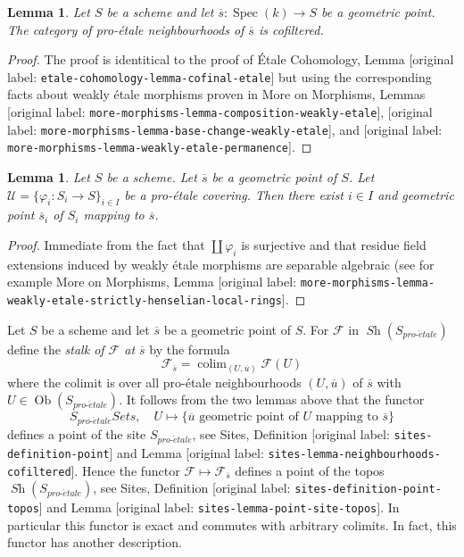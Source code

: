 \documentclass[10pt,a4paper]{article}
\theoremstyle{plain}
\newtheorem{lemma}[subsection]{Lemma}
\theoremstyle{definition}
\theoremstyle{remark}
\numberwithin{equation}{subsection}
\def\colim{\mathop{\mathrm{colim}}\nolimits}
\def\Spec{\mathop{\mathrm{Spec}}}
\def\Ob{\mathop{\mathrm{Ob}}\nolimits}
\def\Sh{\mathop{\mathit{Sh}}\nolimits}
\def\proetale{{pro\text{-}\acute{e}tale}}
\begin{document}
\begin{lemma}
\label{lemma-cofinal-etale}
Let $S$ be a scheme and let $\overline{s} : \Spec(k) \to S$ be a
geometric point. The category of pro-\'etale neighbourhoods of
$\overline{s}$ is cofiltered.
\end{lemma}

\begin{proof}
The proof is identitical to the proof of
\'Etale Cohomology, Lemma \textnormal{[original label: \nolinkurl{etale-cohomology-lemma-cofinal-etale}]}
but using the corresponding facts about weakly \'etale morphisms
proven in
More on Morphisms, Lemmas
\textnormal{[original label: \nolinkurl{more-morphisms-lemma-composition-weakly-etale}]},
\textnormal{[original label: \nolinkurl{more-morphisms-lemma-base-change-weakly-etale}]}, and
\textnormal{[original label: \nolinkurl{more-morphisms-lemma-weakly-etale-permanence}]}.
\end{proof}

\begin{lemma}
\label{lemma-geometric-lift-to-cover}
Let $S$ be a scheme. Let $\overline{s}$ be a geometric point of $S$.
Let $\mathcal{U} = \{\varphi_i : S_i \to S\}_{i\in I}$ be a
pro-\'etale covering. Then there exist $i \in I$ and geometric
point $\overline{s}_i$ of $S_i$ mapping to $\overline{s}$.
\end{lemma}

\begin{proof}
Immediate from the fact that $\coprod \varphi_i$ is surjective
and that residue field extensions induced by weakly \'etale
morphisms are separable algebraic (see for example
More on Morphisms, Lemma
\textnormal{[original label: \nolinkurl{more-morphisms-lemma-weakly-etale-strictly-henselian-local-rings}]}.
\end{proof}

\noindent
Let $S$ be a scheme and let $\overline{s}$ be a geometric point of $S$.
For $\mathcal{F}$ in $\Sh(S_\proetale)$ define the
{\it stalk of $\mathcal{F}$ at $\overline{s}$} by the formula
$$
\mathcal{F}_{\overline{s}} = \colim_{(U, \overline{u})} \mathcal{F}(U)
$$
where the colimit is over all pro-\'etale neighbourhoods $(U, \overline{u})$
of $\overline{s}$ with $U \in \Ob(S_\proetale)$. It follows from the
two lemmas above that the functor
$$
S_\proetale \textit{Sets},\quad
U \longmapsto
\{\overline{u}\text{ geometric point of }U\text{ mapping to }\overline{s}\}
$$
defines a point of the site $S_\proetale$, see
Sites, Definition \textnormal{[original label: \nolinkurl{sites-definition-point}]} and
Lemma \textnormal{[original label: \nolinkurl{sites-lemma-neighbourhoods-cofiltered}]}.
Hence the functor $\mathcal{F} \mapsto \mathcal{F}_{\overline{s}}$
defines a point of the topos $\Sh(S_\proetale)$, see
Sites, Definition \textnormal{[original label: \nolinkurl{sites-definition-point-topos}]} and
Lemma \textnormal{[original label: \nolinkurl{sites-lemma-point-site-topos}]}. In particular this
functor is exact and commutes with arbitrary colimits.
In fact, this functor has another description.
\end{document}
